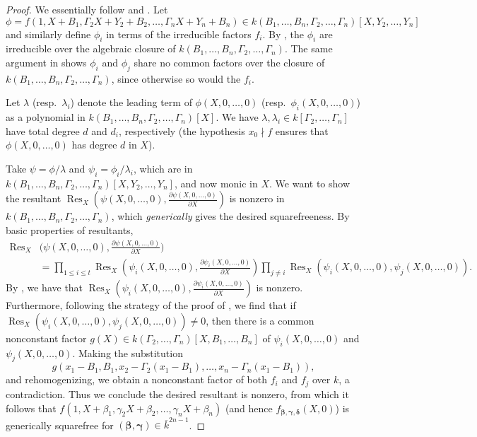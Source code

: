 \documentclass{amsart}
\renewcommand{\v}{\beta}
\newcommand{\w}{\gamma}
\newcommand{\z}{\delta}
\newcommand{\vvar}{B}
\newcommand{\wvar}{\Gamma}
\newcommand{\bv}{\boldsymbol{\v}}
\newcommand{\bw}{\boldsymbol{\w}}
\newcommand{\bz}{\boldsymbol{\z}}
\newcommand{\fvwz}{f_{\bv, \bw, \bz}}
\DeclareMathOperator{\Res}{Res}
\theoremstyle{definition}
\numberwithin{equation}{section}
\numberwithin{table}{section}
\begin{document}
\begin{proof}
	We essentially follow \cite[\S 3.2]{CafureMatera} and \cite[Lemmas 2,3,4]{Kaltofen}. Let 
	\[\phi = f(1, X + \vvar_1, \wvar_2X + Y_2 + \vvar_2, \ldots, \wvar_nX + Y_n + \vvar_n) \in k(\vvar_1, \ldots, \vvar_n, \wvar_2, \ldots, \wvar_n)[X,Y_2,\ldots, Y_n]\]
	and similarly define $\phi_i$ in terms of the irreducible factors $f_i$. By \cite[Lemma 2]{Kaltofen}, the $\phi_i$ are irreducible over the algebraic closure of $k(\vvar_1, \ldots, \vvar_n, \wvar_2, \ldots, \wvar_n)$. The same argument in \cite[Lemma 2]{Kaltofen} shows $\phi_i$ and $\phi_j$ share no common factors over the closure of $k(\vvar_1, \ldots, \vvar_n, \wvar_2, \ldots, \wvar_n)$, since otherwise so would the $f_i$. 
	
	Let $\lambda$ (resp.\ $\lambda_i$) denote the leading term of $\phi(X,0,\ldots,0)$ (resp.\ $\phi_i(X,0,\ldots,0)$) as a polynomial in $k(\vvar_1,\ldots,\vvar_n,\wvar_2,\ldots,\wvar_n)[X]$. We have $\lambda, \lambda_i \in k[\wvar_2,\ldots,\wvar_n]$ have total degree $d$ and $d_i$, respectively (the hypothesis $x_0 \nmid f$ ensures that $\phi(X,0,\ldots,0)$ has degree $d$ in $X$).
	
	Take $\psi = \phi/\lambda$ and $\psi_i = \phi_i/\lambda_i$, which are in $k(\vvar_1, \ldots, \vvar_n, \wvar_2, \ldots, \wvar_n)[X,Y_2,\ldots,Y_n]$, and now monic in $X$. We want to show the resultant $\Res_X\left(\psi(X,0,\ldots,0),\frac{\partial \psi(X,0,\ldots,0)}{\partial X}\right)$ is nonzero in $k(\vvar_1, \ldots, \vvar_n, \wvar_2, \ldots, \wvar_n)$, which \textit{generically} gives the desired squarefreeness. By basic properties of resultants, 
	\begin{align*}
		\Res_X&\Big(\psi(X,0,\ldots,0),\frac{\partial \psi(X,0,\ldots,0)}{\partial X}\Big)\\ 
        &= \prod_{1 \leq i \leq t} \Res_X\left(\psi_i(X,0,\ldots,0),\frac{\partial \psi_i(X,0,\ldots,0)}{\partial X}\right)\prod_{j \neq i} \Res_X\left(\psi_i(X,0,\ldots,0),\psi_j(X,0,\ldots,0)\right).
	\end{align*}
	By \cite[Lemma 3]{Kaltofen}, we have that $\Res_X\left(\psi_i(X,0,\ldots,0),\frac{\partial \psi_i(X,0,\ldots,0)}{\partial X}\right)$ is nonzero. Furthermore, following the strategy of the proof of \cite[Lemma 3]{Kaltofen}, we find that if $\Res_X\left(\psi_i(X,0,\ldots,0),\psi_j(X,0,\ldots,0)\right) \neq 0$, then there is a common nonconstant factor $g(X) \in k(\wvar_2,\ldots,\wvar_n)[X,\vvar_1,\ldots, \vvar_n]$ of $\psi_i(X,0,\ldots,0)$ and $\psi_j(X,0,\ldots,0)$. Making the substitution
	\[g\left(x_1-\vvar_1,\vvar_1,x_2 - \wvar_2(x_1-\vvar_1),\ldots,x_n - \wvar_n(x_1-\vvar_1)\right),\]
	and rehomogenizing, we obtain a nonconstant factor of both $f_i$ and $f_j$ over $k$, a contradiction. Thus we conclude the desired resultant is nonzero, from which it follows that $f(1,X + \v_1, \w_2X + \v_2, \ldots, \w_nX + \v_n)$ (and hence $\fvwz(X,0)$) is generically squarefree for $(\bv,\bw) \in \overline{k}^{2n-1}$.
	

\end{proof}
\end{document}
